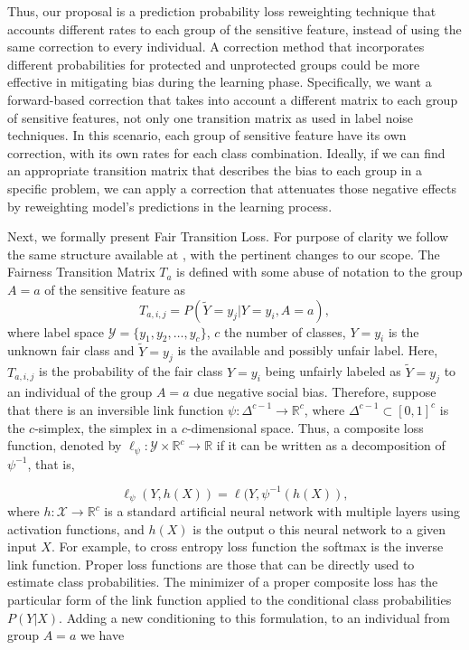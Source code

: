 Thus, our proposal is a prediction probability loss reweighting technique that accounts different rates to each group of the sensitive feature, instead of using the same correction to every individual. A correction method that incorporates different probabilities for protected and unprotected groups could be more effective in mitigating bias during the learning phase. Specifically, we want a forward-based correction that takes into account a different matrix to each group of sensitive features, not only one transition matrix as used in label noise techniques. In this scenario, each group of sensitive feature have its own correction, with its own rates for each class combination. Ideally, if we can find an appropriate transition matrix that describes the bias to each group in a specific problem, we can apply a correction that attenuates those negative effects by reweighting model's predictions in the learning process.

Next, we formally present Fair Transition Loss. For purpose of clarity we follow the same structure available at \citep{Patrini2017}, with the pertinent changes to our scope. The Fairness Transition Matrix $T_a$ is defined with some abuse of notation to the group $A=a$ of the sensitive feature as 
\begin{equation}
    T_{a,i,j} = P(\tilde{Y} = y_j|Y = y_i, A=a),
\end{equation}
where label space $\mathcal{Y} = \{y_1, y_2, \ldots, y_c\}$, $c$ the number of classes, $Y=y_i$ is the unknown fair class and $\tilde{Y}=y_j$ is the available and 
possibly unfair label. Here, $T_{a,i,j}$ is the probability of the fair class $Y=y_i$ being unfairly labeled as $\tilde{Y}=y_j$ to an individual of the group $A=a$ due negative social bias. Therefore, suppose that there is an inversible link function $\psi : \Delta^{c-1} \rightarrow \mathbb{R}^c$, where $\Delta^{c-1} \subset [0,1]^c$ is the $c$-simplex, the simplex in a $c$-dimensional space. Thus, a composite loss function, denoted by $\ell_{\psi} : \mathcal{Y} \times \mathbb{R}^c \rightarrow \mathbb{R}$ if it can be written as a decomposition of $\psi^{-1}$, that is,

\begin{equation}
    \ell_{\psi}(Y, h(X)) = \ell(Y, \psi^{-1}(h(X)), 
\end{equation}
where $h:\mathcal{X} \rightarrow \mathbb{R}^c$ is a standard artificial neural network with multiple layers using activation functions, and $h(X)$ is the output o this neural network to a given input $X$. For example, to cross entropy loss function the softmax is the inverse link function. Proper loss functions are those that can be directly used to estimate class probabilities. The minimizer of a proper composite loss has the particular form of the link function applied to the conditional class probabilities $P(Y|X)$. Adding a new conditioning to this formulation, to an individual from group $A=a$ we have

